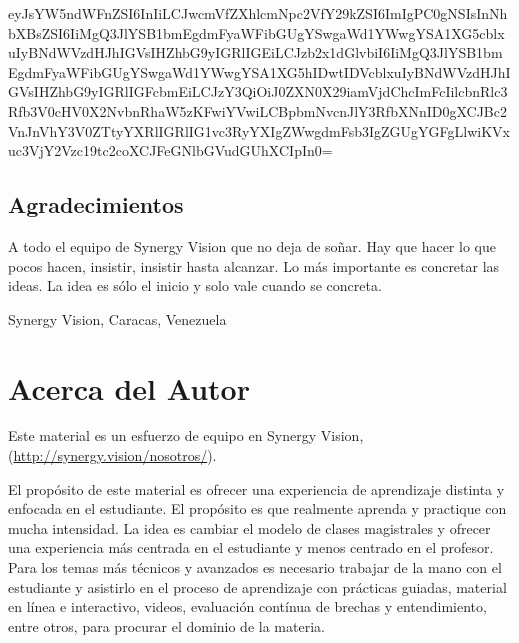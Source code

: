 \documentclass[
  12pt,
]{krantz}
\let\BeginKnitrBlock\begin \let\EndKnitrBlock\end
\begin{document}
eyJsYW5ndWFnZSI6InIiLCJwcmVfZXhlcmNpc2VfY29kZSI6ImIgPC0gNSIsInNhbXBsZSI6IiMgQ3JlYSB1bmEgdmFyaWFibGUgYSwgaWd1YWwgYSA1XG5cblxuIyBNdWVzdHJhIGVsIHZhbG9yIGRlIGEiLCJzb2x1dGlvbiI6IiMgQ3JlYSB1bmEgdmFyaWFibGUgYSwgaWd1YWwgYSA1XG5hIDwtIDVcblxuIyBNdWVzdHJhIGVsIHZhbG9yIGRlIGFcbmEiLCJzY3QiOiJ0ZXN0X29iamVjdChcImFcIilcbnRlc3Rfb3V0cHV0X2NvbnRhaW5zKFwiYVwiLCBpbmNvcnJlY3RfbXNnID0gXCJBc2VnJnVhY3V0ZTtyYXRlIGRlIG1vc3RyYXIgZWwgdmFsb3IgZGUgYGFgLlwiKVxuc3VjY2Vzc19tc2coXCJFeGNlbGVudGUhXCIpIn0=

\hypertarget{agradecimientos}{%
\section*{Agradecimientos}\label{agradecimientos}}


A todo el equipo de Synergy Vision que no deja de soñar. Hay que hacer lo que pocos hacen, insistir, insistir hasta alcanzar. Lo más importante es concretar las ideas. La idea es sólo el inicio y solo vale cuando se concreta.

\BeginKnitrBlock{flushright}
Synergy Vision, Caracas, Venezuela
\EndKnitrBlock{flushright}

\hypertarget{acerca-del-autor}{%
\chapter*{Acerca del Autor}\label{acerca-del-autor}}


Este material es un esfuerzo de equipo en Synergy Vision, (\url{http://synergy.vision/nosotros/}).

El propósito de este material es ofrecer una experiencia de aprendizaje distinta y enfocada en el estudiante. El propósito es que realmente aprenda y practique con mucha intensidad. La idea es cambiar el modelo de clases magistrales y ofrecer una experiencia más centrada en el estudiante y menos centrado en el profesor. Para los temas más técnicos y avanzados es necesario trabajar de la mano con el estudiante y asistirlo en el proceso de aprendizaje con prácticas guiadas, material en línea e interactivo, videos, evaluación contínua de brechas y entendimiento, entre otros, para procurar el dominio de la materia.
\end{document}
